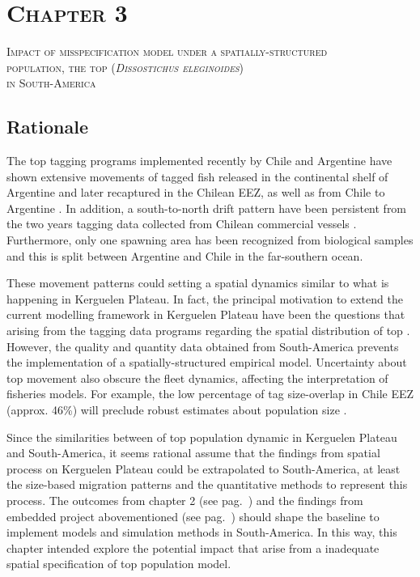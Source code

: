 \section*{\scshape Chapter 3}
{\Large \scshape Impact of misspecification model under a spatially-structured \\ population, the \acl{top} (\emph{Dissostichus eleginoides}) \\ in South-America} %
\label{sec:chapter3}


\subsection*{Rationale}

The \acl{top} tagging programs implemented recently by Chile and Argentine have shown extensive movements of tagged fish released in the continental shelf of Argentine and later recaptured in the Chilean EEZ, as well as from Chile to Argentine \citep{paty2012,trolos2013}. In addition, a south-to-north drift pattern have been persistent from the two years tagging data collected from Chilean commercial vessels \citep{jcq2013}. Furthermore, only one spawning area has been recognized from biological samples and this is split between Argentine and Chile in the far-southern ocean. 

These movement patterns could setting a spatial dynamics similar to what is happening in Kerguelen Plateau. In fact, the principal motivation to extend the current modelling framework in Kerguelen Plateau have been the questions that arising from the tagging data programs regarding the spatial distribution of \acl{top} \citep{Candy2011b}. However, the quality and quantity data obtained from South-America prevents the implementation of a spatially-structured empirical model. Uncertainty about \acl{top} movement also obscure the fleet dynamics, affecting the interpretation of fisheries models. For example, the low percentage of tag size-overlap in Chile EEZ (approx. 46\%) will preclude robust estimates about population size \citep{Candy2011b,wyz2013}. 

Since the similarities between of \acl{top} population dynamic in Kerguelen Plateau and South-America, it seems rational assume that the findings from spatial process on Kerguelen Plateau could be extrapolated to South-America, at least the size-based migration patterns and the quantitative methods to represent this process. The outcomes from chapter 2 (see pag.~\pageref{sec:chapter2}) and the findings from embedded project abovementioned (see pag.~\pageref{subsec:extsupp}) should shape the baseline to implement models and simulation methods in South-America. In this way, this chapter intended explore the potential impact that arise from a  inadequate spatial specification of \acl{top} population model. 


